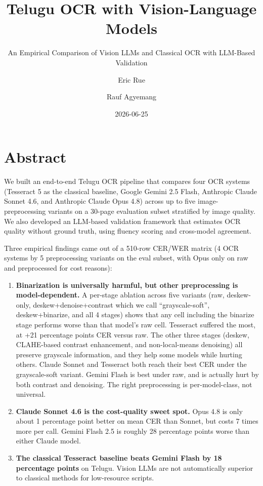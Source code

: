 \documentclass[
  letterpaper,
  DIV=11,
  numbers=noendperiod]{scrartcl}
\title{Telugu OCR with Vision-Language Models}
\subtitle{An Empirical Comparison of Vision LLMs and Classical OCR with
LLM-Based Validation}
\author{Eric Rue \and Rauf Agyemang}
\date{2026-06-25}
\providecommand{\tightlist}{%
  \setlength{\itemsep}{0pt}\setlength{\parskip}{0pt}}
\renewcommand*\contentsname{Table of contents}
\newcommand\contentsname{Table of contents}
\begin{document}
\maketitle

\renewcommand*\contentsname{Table of contents}
{
\setcounter{tocdepth}{3}
\tableofcontents
}

\section*{Abstract}\label{abstract}

We built an end-to-end Telugu OCR pipeline that compares four OCR
systems (Tesseract 5 as the classical baseline, Google Gemini 2.5 Flash,
Anthropic Claude Sonnet 4.6, and Anthropic Claude Opus 4.8) across up to
five image-preprocessing variants on a 30-page evaluation subset
stratified by image quality. We also developed an LLM-based validation
framework that estimates OCR quality without ground truth, using fluency
scoring and cross-model agreement.

Three empirical findings came out of a 510-row CER/WER matrix (4 OCR
systems by 5 preprocessing variants on the eval subset, with Opus only
on raw and preprocessed for cost reasons):

\begin{enumerate}
\def\labelenumi{\arabic{enumi}.}
\tightlist
\item
  \textbf{Binarization is universally harmful, but other preprocessing
  is model-dependent.} A per-stage ablation across five variants (raw,
  deskew-only, deskew+denoise+contrast which we call ``grayscale-soft'',
  deskew+binarize, and all 4 stages) shows that any cell including the
  binarize stage performs worse than that model's raw cell. Tesseract
  suffered the most, at +21 percentage points CER versus raw. The other
  three stages (deskew, CLAHE-based contrast enhancement, and
  non-local-means denoising) all preserve grayscale information, and
  they help some models while hurting others. Claude Sonnet and
  Tesseract both reach their best CER under the grayscale-soft variant.
  Gemini Flash is best under raw, and is actually hurt by both contrast
  and denoising. The right preprocessing is per-model-class, not
  universal.
\item
  \textbf{Claude Sonnet 4.6 is the cost-quality sweet spot.} Opus 4.8 is
  only about 1 percentage point better on mean CER than Sonnet, but
  costs 7 times more per call. Gemini Flash 2.5 is roughly 28 percentage
  points worse than either Claude model.
\item
  \textbf{The classical Tesseract baseline beats Gemini Flash by 18
  percentage points} on Telugu. Vision LLMs are not automatically
  superior to classical methods for low-resource scripts.
\end{enumerate}
\end{document}
